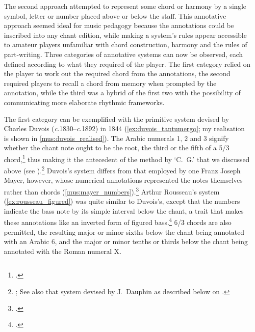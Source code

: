 The second approach attempted to represent some chord or harmony by a single symbol, letter or number placed above or below the staff.
This annotative approach seemed ideal for music pedagogy because the annotations could be inscribed into any chant edition, while making a system's rules appear accessible to amateur players unfamiliar with chord construction, harmony and the rules of part-writing.
Three categories of annotative systems can now be observed, each defined according to what they required of the player.
The first category relied on the player to work out the required chord from the annotations, the second required players to recall a chord from memory when prompted by the annotation, while the third was a hybrid of the first two with the possibility of communicating more elaborate rhythmic frameworks.

The first category can be exemplified with the primitive system devised by Charles Duvois (\emph{c}.1830--\emph{c}.1892) in 1844 (\cref{ex:duvois_tantumergo}; my realisation is shown in \cref{mus:duvois_realised}).
%
The Arabic numerals 1, 2 and 3 signify whether the chant note ought to be the root, the third or the fifth of a 5/3 chord,\footcite[27]{DuvoisMethodeelementaireaccompagnement1844} thus making it the antecedent of the method by `C.~G.' that we discussed above (see ).\footnote{\cite[The method was also taken up in][72--80, though it should be noted that some of the indications provided by the author either mislabel or mistranscribe certain chords]{Courtoisaccompagnementplainchantprecedee1897}; See also that system devised by J.\ Dauphin as described below on .}
%
Duvois's system differs from that employed by one Franz Joseph Mayer, however, whose numerical annotations represented the notes themselves rather than chords (\cref{mus:mayer_numbers}).\footcite[26]{MayerLateinischeChoralgesangefur1867}
Arthur Rousseau's system (\cref{ex:rousseau_figured}) was quite similar to Duvois's, except that the numbers indicate the bass note by its simple interval below the chant, a trait that makes these annotations like an inverted form of figured bass.\footcite[63]{Rousseaupetitharmonistegregorien1889}
6/3 chords are also permitted, the resulting major or minor sixths below the chant being annotated with an Arabic 6, and the major or minor tenths or thirds below the chant being annotated with the Roman numeral X.

